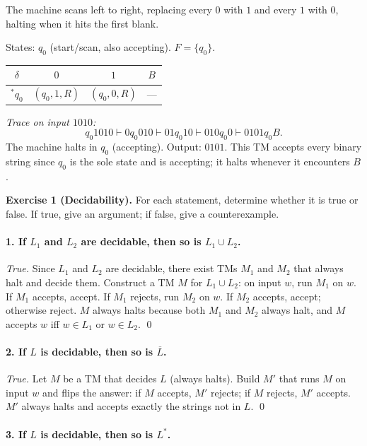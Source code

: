 \documentclass{article}
\theoremstyle{theorem}
\theoremstyle{definition}
\theoremstyle{remark}
\begin{document}
The machine scans left to right, replacing every $0$ with $1$ and every $1$ with $0$, halting when it hits the first blank.

States: $q_0$ (start/scan, also accepting). $F = \{q_0\}$.

\begin{center}
\begin{tabular}{c|ccc}
$\delta$ & $0$ & $1$ & $B$ \\ \hline
${}^*q_0$ & $(q_0, 1, R)$ & $(q_0, 0, R)$ & --- \\
\end{tabular}
\end{center}

\emph{Trace on input $1010$:}
\[
  q_0 1010 \vdash 0q_0 010 \vdash 01q_0 10 \vdash 010q_0 0 \vdash 0101q_0 B.
\]
The machine halts in $q_0$ (accepting). Output: $0101$. This TM accepts every binary string since $q_0$ is the sole state and is accepting; it halts whenever it encounters $B$.

\bigskip

\textbf{Exercise 1 (Decidability).}
For each statement, determine whether it is true or false. If true, give an argument; if false, give a counterexample.

\paragraph{1. If $L_1$ and $L_2$ are decidable, then so is $L_1 \cup L_2$.}

\emph{True.} Since $L_1$ and $L_2$ are decidable, there exist TMs $M_1$ and $M_2$ that always halt and decide them. Construct a TM $M$ for $L_1 \cup L_2$: on input $w$, run $M_1$ on $w$. If $M_1$ accepts, accept. If $M_1$ rejects, run $M_2$ on $w$. If $M_2$ accepts, accept; otherwise reject. $M$ always halts because both $M_1$ and $M_2$ always halt, and $M$ accepts $w$ iff $w \in L_1$ or $w \in L_2$. \qed

\paragraph{2. If $L$ is decidable, then so is $\overline{L}$.}

\emph{True.} Let $M$ be a TM that decides $L$ (always halts). Build $M'$ that runs $M$ on input $w$ and flips the answer: if $M$ accepts, $M'$ rejects; if $M$ rejects, $M'$ accepts. $M'$ always halts and accepts exactly the strings not in $L$. \qed

\paragraph{3. If $L$ is decidable, then so is $L^*$.}
\end{document}
